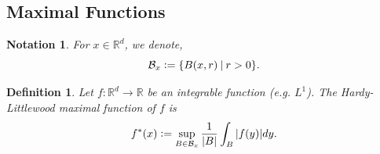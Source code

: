 \documentclass[8pt]{article}
\newtheorem{definition}{Definition}[section]
\newtheorem{notation}{Notation}[section]
\newcommand{\ab}[1]{\vert #1 \vert}
\newcommand{\sep}[0]{\:\vert\:}
\newcommand{\defeq}{\vcentcolon=}
\newcommand{\bR}[0]{\mathbb{R}}
\newcommand{\cB}[0]{\mathcal{B}}
\begin{document}
\subsection{Maximal Functions}

\begin{notation}
  For $x\in\bR^d$, we denote,
  \begin{equation*}
    \cB_x \defeq \{B(x,r)\sep r>0\}.
  \end{equation*}
\end{notation}

\begin{definition}
  Let $f:\bR^d\to \bR$ be an integrable function (e.g. $L^1$). The Hardy-Littlewood maximal function of $f$ is 
  \begin{equation*}
    f^*(x) \defeq \sup_{B\in\cB_x}{\frac 1 {\ab{B}}}\int_B\ab{f(y)}dy.
  \end{equation*}
\end{definition}
\end{document}

